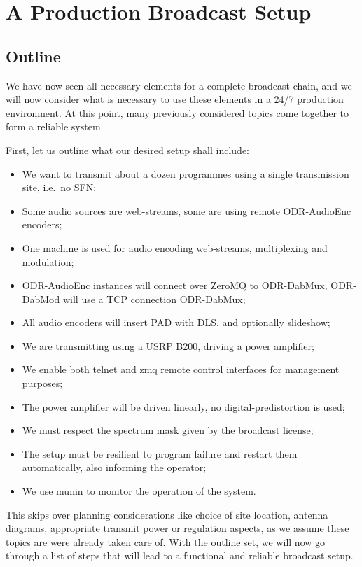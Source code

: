 \section{A Production Broadcast Setup}
\subsection{Outline}
We have now seen all necessary elements for a complete broadcast chain, and we
will now consider what is necessary to use these elements in a 24/7 production
environment. At this point, many previously considered topics come together to
form a reliable system.

First, let us outline what our desired setup shall include:

\begin{itemize}
    \item We want to transmit about a dozen programmes using a single
        transmission site, i.e.~no SFN;
    \item Some audio sources are web-streams, some are using remote ODR-AudioEnc
        encoders;
    \item One machine is used for audio encoding web-streams, multiplexing and
        modulation;
    \item ODR-AudioEnc instances will connect over ZeroMQ to ODR-DabMux,
        ODR-DabMod will use a TCP connection ODR-DabMux;
    \item All audio encoders will insert PAD with DLS, and optionally slideshow;
    \item We are transmitting using a USRP B200, driving a power amplifier;
    \item We enable both telnet and zmq remote control interfaces for management
        purposes;
    \item The power amplifier will be driven linearly, no digital-predistortion
        is used;
    \item We must respect the spectrum mask given by the broadcast license;
    \item The setup must be resilient to program failure and restart them
        automatically, also informing the operator;
    \item We use munin to monitor the operation of the system.
\end{itemize}

This skips over planning considerations like choice of site location, antenna
diagrams, appropriate transmit power or regulation aspects, as we assume these
topics are were already taken care of.
With the outline set, we will now go through a list of steps that will lead to a
functional and reliable broadcast setup.


